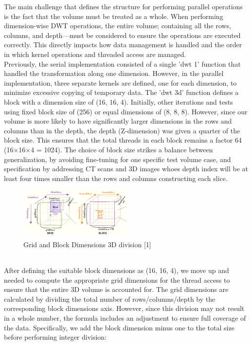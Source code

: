 \documentclass[journal,11pt]{IEEEtran}
\begin{document}
The main challenge that defines the structure for performing parallel operations is the fact that the volume must be treated as a whole. When performing dimension-wise DWT operations, the entire volume; containing all the rows, columns, and depth—must be considered to ensure the operations are executed correctly. This directly impacts how data management is handled and the order in which kernel operations and threaded access are managed.\\

Previously, the serial implementation consisted of a single 'dwt 1' function that handled the transformation along one dimension. However, in the parallel implementation, three separate kernels are defined, one for each dimension, to minimize excessive copying of temporary data. The 'dwt 3d' function defines a block with a dimension size of (16, 16, 4). Initially, other iterations and tests using fixed block size of (256) or equal dimensions of (8, 8, 8). However, since our volume is more likely to have significantly larger dimensions in the rows and columns than in the depth, the depth (Z-dimension) was given a quarter of the block size. This ensures that the total threads in each block remains a factor 64 (16×16×4 = 1024). The choice of block size strikes a balance between generalization, by avoiding fine-tuning for one specific test volume case, and specification by addressing CT scans and 3D images whoes depth index will be at least four times smaller than the rows and columns constructing each slice.
\vspace{-1.2em}
\begin{figure}[h]
    \centering
    \includegraphics[width=0.5\textwidth]{assets/grid_block.png}
    \caption{Grid and Block Dimensions 3D division [1]}
    \label{fig:1}
\end{figure}
\vspace{-0.2em}\\
After defining the suitable block dimensions as (16, 16, 4), we move up and needed to compute the appropriate grid dimensions for the thread access to ensure that the entire 3D volume is accounted for. The grid dimensions are calculated by dividing the total number of rows/columns/depth by the corresponding block dimensions axis. However, since this division may not result in a whole number, the formula includes an adjustment to ensure full coverage of the data. Specifically, we add the block dimension minus one to the total size before performing integer division:
\end{document}
